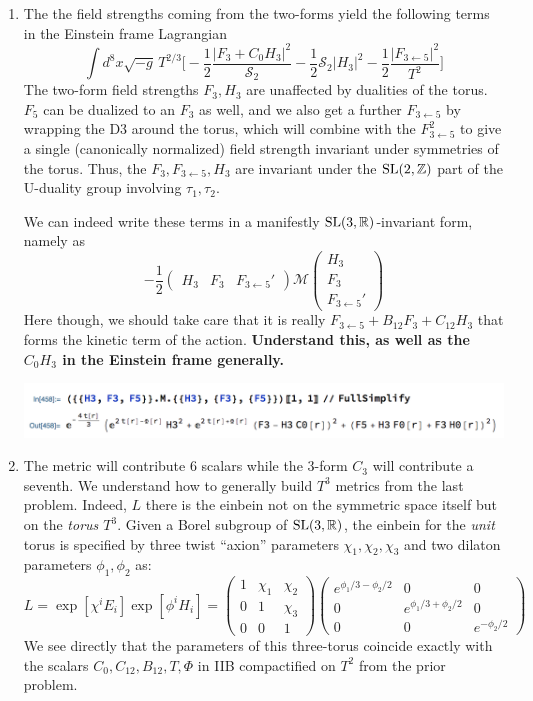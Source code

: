 \documentclass[11pt, class=article, crop=false]{standalone}
\begin{document}
\begin{enumerate}
	\item The the field strengths coming from the two-forms yield the following terms in the Einstein frame Lagrangian
	\[
		\int d^{8} x \sqrt{-g}\, T^{2/3} \Big[ -\frac12 \frac{|F_3 + C_0 H_3|^2}{\mathcal S_2} - \frac12 \mathcal S_2 |H_3|^2- \frac12 \frac{|F_{3 \leftarrow 5}|^2}{T^2} \Big]
	\]
	The two-form field strengths $F_3, H_3$ are unaffected by dualities of the torus. $F_5$ can be dualized to an $F_3$ as well, and we also get a further $F_{3 \leftarrow 5}$ by wrapping the D3 around the torus, which will combine with the $F_{3 \leftarrow 5}^2$ to give a single (canonically normalized) field strength invariant under symmetries of the torus. Thus, the $F_3, F_{3 \leftarrow 5}, H_3$ are invariant under the $\mathrm{SL}(2, \mathbb{Z})$ part of the U-duality group involving $\tau_1, \tau_2$. 
	
	We can indeed write these terms in a manifestly $\mathrm{SL}(3, \mathbb{R})$-invariant form, namely as
	\[
		-\frac12 \begin{pmatrix}
			H_3 & F_3 & F_{3 \leftarrow 5}'
		\end{pmatrix} \mathcal M \begin{pmatrix}
			H_3 \\ F_3 \\ F_{3 \leftarrow 5}' 
		\end{pmatrix}
	\]
	Here though, we should take care that it is really $F_{3 \leftarrow 5} + B_{12} F_3 + C_{12} H_3$ that forms the kinetic term of the action. \textbf{Understand this, as well as the $C_0 H_3$ in the Einstein frame generally.}
	\begin{center}
		\includegraphics[scale=0.6]{"Figures/SL(3,R) triplet"}
	\end{center}
	
	\item The metric will contribute $6$ scalars while the $3$-form $C_3$ will contribute a seventh. We understand how to generally build $T^3$ metrics from the last problem. Indeed, $L$ there is the einbein not on the symmetric space itself but on the \emph{torus $T^3$}. Given a Borel subgroup of $\mathrm{SL}(3, \mathbb{R})$, the einbein for the \emph{unit} torus is specified by three twist ``axion'' parameters $\chi_1, \chi_2, \chi_3$ and two dilaton parameters $\phi_1, \phi_2$ as:
	\[
		L = \exp[\chi^i E_i] \exp[\phi^i H_i] =  \begin{pmatrix}
			1 & \chi_1 & \chi_2 \\
			0 & 1 & \chi_3\\
			0 & 0 & 1
		\end{pmatrix} \begin{pmatrix}
			e^{\phi_1/3 - \phi_2/2} & 0 & 0\\
			0 & e^{\phi_1/3 + \phi_2/2} & 0\\
			0 & 0 & e^{-\phi_2/2}
		\end{pmatrix}
	\]
	We see directly that the parameters of this three-torus coincide exactly with the scalars $C_0, C_{12}, B_{12}, T, \Phi$ in IIB compactified on $T^2$ from the prior problem. 
	

\end{enumerate}
\end{document}
